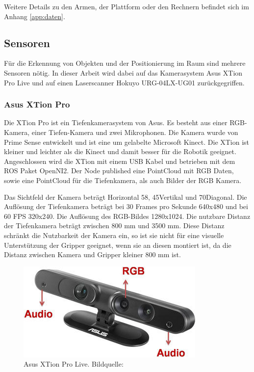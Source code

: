 Weitere Details zu den Armen, der Plattform oder den Rechnern befindet sich im Anhang \ref{app:daten}.%

\subsection{Sensoren}
Für die Erkennung von Objekten und der Positionierung im Raum sind mehrere Sensoren nötig. In dieser Arbeit wird dabei auf das Kamerasystem Asus XTion Pro Live und auf einen Laserscanner Hokuyo URG-04LX-UG01 zurückgegriffen.

\subsubsection{Asus XTion Pro}
Die XTion Pro ist ein Tiefenkamerasystem von Asus. Es besteht aus einer RGB-Kamera, einer Tiefen-Kamera und zwei Mikrophonen. Die Kamera wurde von Prime Sense entwickelt und ist eine um gelabelte Microsoft Kinect. Die XTion ist kleiner und leichter als die Kinect und damit besser für die Robotik geeignet. Angeschlossen wird die XTion mit einem USB Kabel und betrieben mit dem ROS Paket OpenNI2. Der Node published eine PointCloud mit RGB Daten, sowie eine PointCloud für die Tiefenkamera, als auch Bilder der RGB Kamera.

Das Sichtfeld der Kamera beträgt Horizontal 58\textdegree, 45\textdegree Vertikal und 70\textdegree Diagonal. Die Auflösung der Tiefenkamera beträgt bei 30 Frames pro Sekunde 640x480 und bei 60 FPS 320x240. Die Auflösung des RGB-Bildes 1280x1024. Die nutzbare Distanz der Tiefenkamera beträgt zwischen 800 mm und 3500 mm.\cite{asus2015} Diese Distanz schränkt die Nutzbarkeit der Kamera ein, so ist sie nicht für eine visuelle Unterstützung der Gripper geeignet, wenn sie an diesen montiert ist, da die Distanz zwischen Kamera und Gripper kleiner 800 mm ist.

\begin{figure}[H]
	\centering
	\includegraphics[scale=0.8]{fig/xtion1}   
	\caption[Asus Xtion Pro Live]{Asus XTion Pro Live. Bildquelle: \cite{asus2015}}
	\label{fig:aufbau-xtion}
\end{figure}

